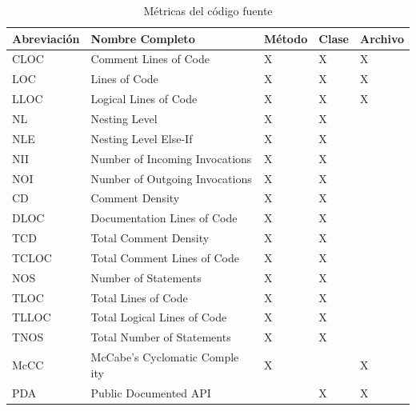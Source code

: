 \begin{table}[H]
{
\fontsize{8pt}{4pt}\selectfont
\captionsetup{labelsep=period, labelfont=bf}
\caption{Métricas del código fuente}
\centering
\begin{tabular}{lllll}
\toprule
Abreviación & Nombre Completo                               & Método & Clase & Archivo \\
\midrule
CLOC        & Comment Lines of Code                         & X      & X     & X       \\
LOC         & Lines of Code                                 & X      & X     & X       \\
LLOC        & Logical Lines of Code                         & X      & X     & X       \\
NL          & Nesting Level                                 & X      & X     &         \\
NLE         & Nesting Level Else-If                         & X      & X     &         \\
NII         & Number of Incoming   Invocations              & X      & X     &         \\
NOI         & Number of Outgoing Invocations                & X      & X     &         \\
CD          & Comment Density                               & X      & X     &         \\
DLOC        & Documentation Lines of Code                   & X      & X     &         \\
TCD         & Total Comment Density                         & X      & X     &         \\
TCLOC       & Total Comment   Lines of Code                 & X      & X     &         \\
NOS         & Number of Statements                          & X      & X     &         \\
TLOC        & Total Lines of Code                           & X      & X     &         \\
TLLOC       & Total   Logical Lines of Code                 & X      & X     &         \\
TNOS        & Total Number of Statements                    & X      & X     &         \\
McCC        & McCabe’s Cyclomatic Comple   ity              & X      &       & X       \\
PDA         & Public Documented API                         &        & X     & X       \\

\end{tabular}}
\end{table}
